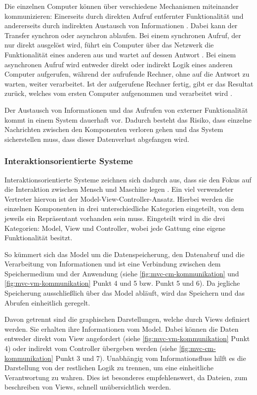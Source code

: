 Die einzelnen Computer können über verschiedene Mechanismen miteinander kommunizieren: Einerseits durch direkten Aufruf entfernter Funktionalität und andererseits durch indirekten Austausch von Informationen \parencite[vgl.][S. 116]{starke_effektive_2015}. Dabei kann der Transfer synchron oder asynchron ablaufen. Bei einem synchronen Aufruf, der nur direkt ausgelöst wird, führt ein Computer über das Netzwerk die Funktionalität eines anderen aus und wartet auf dessen Antwort \parencite{synchrone_2018}.
Bei einem asynchronen Aufruf wird entweder direkt oder indirekt Logik eines anderen Computer aufgerufen, während der aufrufende Rechner, ohne auf die Antwort zu warten, weiter verarbeitet. Ist der aufgerufene Rechner fertig, gibt er das Resultat zurück, welches vom ersten Computer aufgenommen und verarbeitet wird \parencite{wiki_asynchrone_2019}.

Der Austausch von Informationen und das Aufrufen von externer Funktionalität kommt in einem System dauerhaft vor. Dadurch besteht das Risiko, dass einzelne Nachrichten zwischen den Komponenten verloren gehen und das System sicherstellen muss, dass dieser Datenverlust abgefangen wird.

\subsubsection{Interaktionsorientierte Systeme}
\label{sec:mvc}

Interaktionsorientierte Systeme zeichnen sich dadurch aus, dass sie den Fokus auf die Interaktion zwischen Mensch und Maschine legen \parencite[vgl.][S. 124]{starke_effektive_2015}.
Ein viel verwendeter Vertreter hiervon ist der Model-View-Controller-Ansatz. Hierbei werden die einzelnen Komponenten in drei unterschiedliche Kategorien eingeteilt, von dem jeweils ein Repräsentant vorhanden sein muss. Eingeteilt wird in die drei Kategorien: Model, View und Controller, wobei jede Gattung eine eigene Funktionalität besitzt.

So kümmert sich das Model um die Datenspeicherung, den Datenabruf und die Verarbeitung von Informationen und ist eine Verbindung zwischen dem Speichermedium und der Anwendung (siehe \cref{fig:mvc-cm-kommunikation} und \cref{fig:mvc-vm-kommunikation} Punkt 4 und 5 bzw. Punkt 5 und 6). Da jegliche Speicherung ausschließlich über das Model abläuft, wird das Speichern und das Abrufen einheitlich geregelt.

Davon getrennt sind die graphischen Darstellungen, welche durch Views definiert werden. Sie erhalten ihre Informationen vom Model. Dabei können die Daten entweder direkt vom View angefordert (siehe \cref{fig:mvc-vm-kommunikation} Punkt 4) oder indirekt vom Controller übergeben werden (siehe \cref{fig:mvc-cm-kommunikation} Punkt 3 und 7). Unabhängig vom Informationsfluss hilft es die Darstellung von der restlichen Logik zu trennen, um eine einheitliche Verantwortung zu wahren. Dies ist besonderes empfehlenswert, da Dateien, zum beschreiben von Views, schnell unübersichtlich werden.

